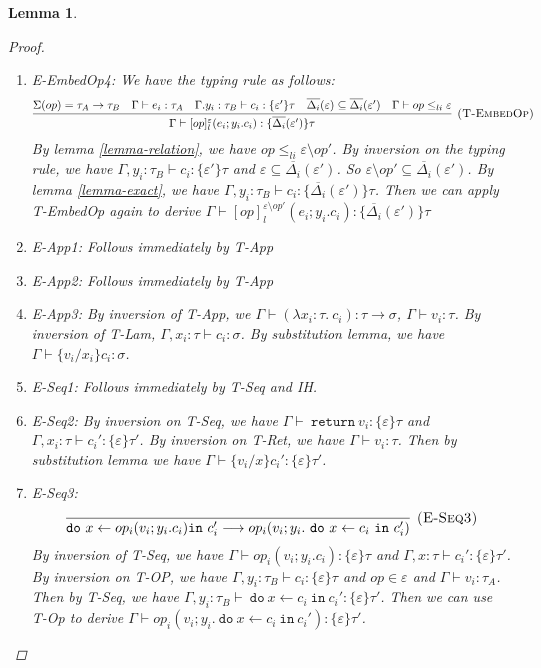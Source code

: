 \documentclass{article}
\newtheorem{lemma}[theorem]{Lemma}
\theoremstyle{definition}
\newcommand{\m}[1]{\ \texttt{#1}\ }
\begin{document}
\begin{lemma}
\begin{proof}
\begin{enumerate}
\item E-EmbedOp4:
We have the typing rule as follows:
$$\infer[\textsc{(T-EmbedOp)}]
  {\Gamma\vdash [op]^\varepsilon_l(e_i; y_i.c_i) : \{\overline{\Delta_i}(\varepsilon')\}\tau }
  {\Sigma(op) = \tau_A \rightarrow \tau_B & \Gamma \vdash e_i : \tau_A & \Gamma. y_i:\tau_B\vdash c_i: \{\varepsilon'\}\tau & \overline{\Delta_i}(\varepsilon) \subseteq \overline{\Delta_i}(\varepsilon') & \Gamma \vdash op \leq_{li} \varepsilon}  $$
By lemma \ref{lemma-relation}, we have $op \leq_{li} \varepsilon \setminus op'$. By inversion on the typing rule, we have $\Gamma, y_i:\tau_B \vdash c_i:\{\varepsilon'\}\tau$ and $\varepsilon \subseteq \overline{\Delta_i}(\varepsilon')$.  So $\varepsilon \setminus op' \subseteq \overline{\Delta_i}(\varepsilon')$. By lemma \ref{lemma-exact}, we have $\Gamma, y_i:\tau_B \vdash c_i:\{\overline{\Delta_i}(\varepsilon')\}\tau$. Then we can apply T-EmbedOp again to derive $\Gamma\vdash [op]^{\varepsilon \setminus op'}_l(e_i; y_i.c_i) : \{\overline{\Delta_i}(\varepsilon')\}\tau $
  
\item E-App1: Follows immediately by T-App
\item E-App2: Follows immediately by T-App
\item E-App3: By inversion of T-App, we $\Gamma \vdash (\lambda x_i: \tau.\ c_i) : \tau \rightarrow \sigma$, $\Gamma \vdash v_i : \tau$. By inversion of T-Lam, $\Gamma, x_i:\tau \vdash c_i : \sigma$. By substitution lemma, we have $\Gamma \vdash \{v_i/x_i\}c_i : \sigma$.

\item E-Seq1:  Follows immediately by T-Seq and IH.
\item E-Seq2: By inversion on T-Seq, we have $\Gamma \vdash \m{return} v_i : \{\varepsilon\}\tau$ and $\Gamma, x_i:  \tau \vdash c_i': \{\varepsilon\}\tau'$. By inversion on T-Ret, we have $\Gamma \vdash v_i: \tau$. Then by substitution lemma we have $\Gamma \vdash \{v_i/x\}c_i' : \{\varepsilon\}\tau'$.
\item E-Seq3: 
$$
\infer[\textsc{(E-Seq3)}]
  {\texttt{do}\ x \leftarrow op_i(v_i; y_i.c_i) \texttt{in}\ c_i' \longrightarrow op_i(v_i; y_i. \m{do} x \leftarrow c_i \m{in} c_i')}
  {} $$
  By inversion of T-Seq, we have $\Gamma \vdash op_i(v_i; y_i.c_i) : \{\varepsilon\}\tau$  and $\Gamma , x:\tau \vdash c_i' : \{\varepsilon\}\tau'$. By inversion on T-OP, we have $\Gamma, y_i: \tau_B \vdash c_i: \{\varepsilon\}\tau$ and $op \in \varepsilon$ and $\Gamma \vdash v_i : \tau_A$.  Then by T-Seq, we have $\Gamma, y_i : \tau_B \vdash \m{do} x \leftarrow c_i \m{in} c_i' : \{\varepsilon\}\tau'$. Then we can use T-Op to derive $\Gamma \vdash op_i(v_i; y_i. \m{do} x \leftarrow c_i \m{in} c_i') : \{\varepsilon\}\tau'$.


\end{enumerate}
\end{proof}
\end{lemma}
\end{document}
